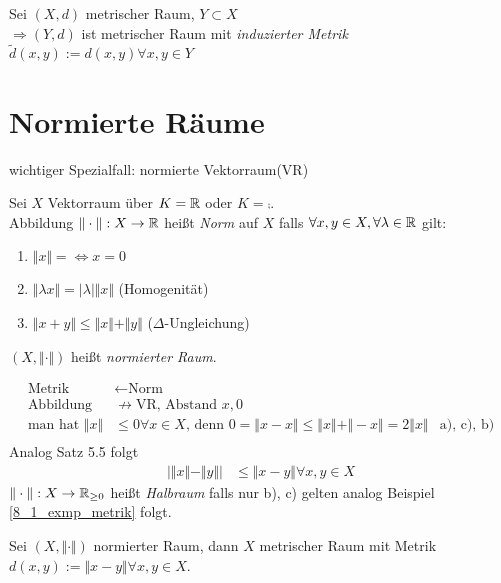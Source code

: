 \begin{exmpn}
	Sei $(X,d)$ metrischer Raum, $Y \subset X$\\
    $\Rightarrow (Y,d)$ ist metrischer Raum mit \emph{induzierter Metrik} $\tilde{d}(x,y):=d(x,y)\forall x,y \in Y$
\end{exmpn}

\section{Normierte Räume}

wichtiger Spezialfall: normierte Vektorraum(VR)

\begin{mydefn}[Norm]
    Sei $X$ Vektorraum über $K=\mathbb{R}$ oder $K=\comp$.\\
    Abbildung $\Vert \cdot \Vert: X \to \mathbb{R}$ heißt \emph{Norm} auf $X$ falls $\forall x,y \in X, \forall \lambda \in \mathbb{R}$ gilt:
    \begin{enumerate}[label={\alph*)}]
    \item $\Vert x\Vert = \Leftrightarrow x=0$
    \item $\Vert \lambda x\Vert = \vert \lambda \vert \Vert x\Vert$ (Homogenität)
    \item $\Vert x+y\Vert \leq \Vert x\Vert + \Vert y\Vert$ ($\Delta$-Ungleichung)
    \end{enumerate}
    $(X,\Vert \cdot\Vert)$ heißt \emph{normierter Raum}.
\end{mydefn}

\begin{align*}
    \text{Metrik} &\leftarrow \text{Norm}&\\
    \text{Abbildung} & \not \rightarrow \text{VR, Abstand } x,0\\
    \text{man hat } \Vert x \Vert &\leq 0 \forall x \in X \text{, denn } 0 = \Vert x-x\Vert \leq \Vert x\Vert + \Vert -x\Vert = 2\Vert x\Vert & \text{a), c), b)}\\   
\end{align*}
Analog Satz 5.5 folgt\\
\begin{align}
    \vert \Vert x \Vert - \Vert y \Vert\vert &\leq \Vert x-y\Vert \forall x,y \in X
\end{align}
$\Vert \cdot\Vert: X \to \mathbb{R}_{\geq0}$ heißt \emph{Halbraum} falls nur b), c) gelten analog Beispiel \ref{8_1_exmp_metrik} folgt.

\begin{satz}
    Sei $(X,\Vert\cdot \Vert)$ normierter Raum, dann $X$ metrischer Raum mit Metrik $d(x,y):=\Vert x-y \Vert\forall x,y \in X$.
\end{satz}

